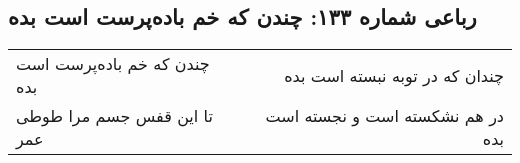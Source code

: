 \begin{center}
\section*{رباعی شماره ۱۳۳: چندن که خم باده‌پرست است بده}
\label{sec:133}
\begin{longtable}{l p{0.5cm} r}
چندن که خم باده‌پرست است بده
&&
چندان که در توبه نبسته است بده
\\
تا این قفس جسم مرا طوطی عمر
&&
در هم نشکسته است و نجسته است بده
\\
\end{longtable}
\end{center}
